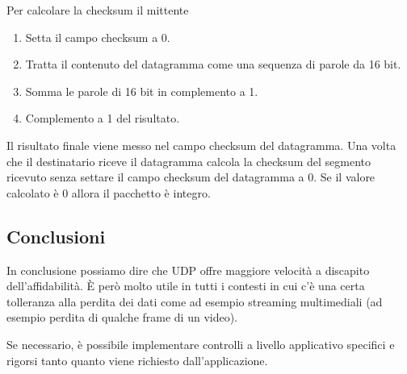 Per calcolare la checksum il mittente
\begin{enumerate}
	\item Setta il campo checksum a 0.
	\item Tratta il contenuto del datagramma come una sequenza di parole
		da 16 bit.
	\item Somma le parole di 16 bit in complemento a 1.
	\item Complemento a 1 del risultato.
\end{enumerate}
Il risultato finale viene messo nel campo checksum del datagramma. Una 
volta che il destinatario riceve il datagramma calcola la checksum del 
segmento ricevuto senza settare il campo checksum del datagramma a 0. Se
il valore calcolato è 0 allora il pacchetto è integro.

\subsection{Conclusioni}
In conclusione possiamo dire che UDP offre maggiore velocità a discapito
dell'affidabilità. \`E però molto utile in tutti i contesti in cui c'è 
una certa tolleranza alla perdita dei dati come ad esempio streaming 
multimediali (ad esempio perdita di qualche frame di un video).

Se necessario, è possibile implementare controlli a livello applicativo 
specifici e rigorsi tanto quanto viene richiesto dall'applicazione.

